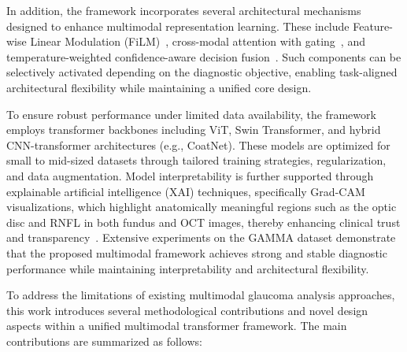 \documentclass[preprint,12pt]{elsarticle}
\begin{document}
In addition, the framework incorporates several architectural mechanisms designed to enhance multimodal representation learning. These include Feature-wise Linear Modulation (FiLM)~\cite{perez2018film}, cross-modal attention with gating~\cite{song2022cross}, and temperature-weighted confidence-aware decision fusion~\cite{kull2019beyond}. Such components can be selectively activated depending on the diagnostic objective, enabling task-aligned architectural flexibility while maintaining a unified core design.

To ensure robust performance under limited data availability, the framework employs transformer backbones including ViT, Swin Transformer, and hybrid CNN-transformer architectures (e.g., CoatNet). These models are optimized for small to mid-sized datasets through tailored training strategies, regularization, and data augmentation. Model interpretability is further supported through explainable artificial intelligence (XAI) techniques, specifically Grad-CAM visualizations, which highlight anatomically meaningful regions such as the optic disc and RNFL in both fundus and OCT images, thereby enhancing clinical trust and transparency~\cite{lai2024interpretable,bhuiyan2024interpretable}. Extensive experiments on the GAMMA dataset demonstrate that the proposed multimodal framework achieves strong and stable diagnostic performance while maintaining interpretability and architectural flexibility.

To address the limitations of existing multimodal glaucoma analysis approaches, this work introduces several methodological contributions and novel design aspects within a unified multimodal transformer framework. The main contributions are summarized as follows:
\end{document}

